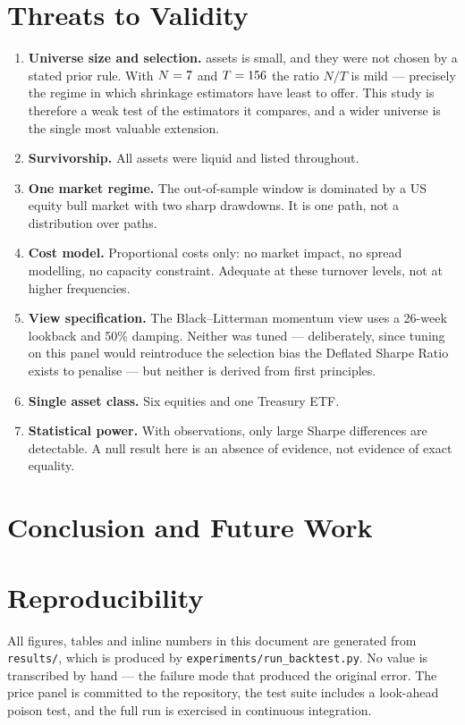 \documentclass[a4paper,12pt]{article}
\begin{document}
\section{Threats to Validity}
\label{sec:threats}
\begin{enumerate}[noitemsep]
  \item \textbf{Universe size and selection.} \nAssets{} assets is small, and they
  were not chosen by a stated prior rule. With $N = 7{}$ and
  $T = 156{}$ the ratio $N/T$ is mild --- precisely the regime in which
  shrinkage estimators have least to offer. This study is therefore a weak test of
  the estimators it compares, and a wider universe is the single most valuable
  extension.
  \item \textbf{Survivorship.} All assets were liquid and listed throughout.
  \item \textbf{One market regime.} The out-of-sample window is dominated by a US
  equity bull market with two sharp drawdowns. It is one path, not a distribution
  over paths.
  \item \textbf{Cost model.} Proportional costs only: no market impact, no spread
  modelling, no capacity constraint. Adequate at these turnover levels, not at
  higher frequencies.
  \item \textbf{View specification.} The Black--Litterman momentum view uses a
  26-week lookback and 50\% damping. Neither was tuned --- deliberately, since
  tuning on this panel would reintroduce the selection bias the Deflated Sharpe
  Ratio exists to penalise --- but neither is derived from first principles.
  \item \textbf{Single asset class.} Six equities and one Treasury ETF.
  \item \textbf{Statistical power.} With \oosPeriods{} observations, only large
  Sharpe differences are detectable. A null result here is an absence of evidence,
  not evidence of exact equality.
\end{enumerate}

\section{Conclusion and Future Work}


\section*{Reproducibility}
All figures, tables and inline numbers in this document are generated from
\texttt{results/}, which is produced by \texttt{experiments/run\_backtest.py}. No
value is transcribed by hand --- the failure mode that produced the original
error. The price panel is committed to the repository, the test suite includes a
look-ahead poison test, and the full run is exercised in continuous integration.
\end{document}
